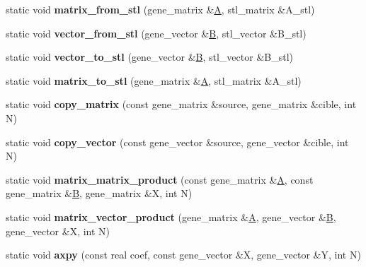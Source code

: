 \begin{DoxyCompactItemize}
static void {\bfseries matrix\+\_\+from\+\_\+stl} (gene\+\_\+matrix \&\hyperlink{group___core___module_class_eigen_1_1_matrix}{A}, stl\+\_\+matrix \&A\+\_\+stl)
\item 
\mbox{\label{classtiny__blitz__interface_a6707d134768a5efeec105f9a629e08ad}} 
static void {\bfseries vector\+\_\+from\+\_\+stl} (gene\+\_\+vector \&\hyperlink{group___core___module_class_eigen_1_1_matrix}{B}, stl\+\_\+vector \&B\+\_\+stl)
\item 
\mbox{\label{classtiny__blitz__interface_a8e5291a4089ac65bc2f85a63887cf01b}} 
static void {\bfseries vector\+\_\+to\+\_\+stl} (gene\+\_\+vector \&\hyperlink{group___core___module_class_eigen_1_1_matrix}{B}, stl\+\_\+vector \&B\+\_\+stl)
\item 
\mbox{\label{classtiny__blitz__interface_ac76e0cdc391a7393cf83ae53ae2b4967}} 
static void {\bfseries matrix\+\_\+to\+\_\+stl} (gene\+\_\+matrix \&\hyperlink{group___core___module_class_eigen_1_1_matrix}{A}, stl\+\_\+matrix \&A\+\_\+stl)
\item 
\mbox{\label{classtiny__blitz__interface_ad79c33f9a498bc78296d6d0b16666ed2}} 
static void {\bfseries copy\+\_\+matrix} (const gene\+\_\+matrix \&source, gene\+\_\+matrix \&cible, int N)
\item 
\mbox{\label{classtiny__blitz__interface_a7bad519f87a2e816fc1057be59fa8274}} 
static void {\bfseries copy\+\_\+vector} (const gene\+\_\+vector \&source, gene\+\_\+vector \&cible, int N)
\item 
\mbox{\label{classtiny__blitz__interface_a3e82c9c3e4313dca04a39a1e008c3338}} 
static void {\bfseries matrix\+\_\+matrix\+\_\+product} (const gene\+\_\+matrix \&\hyperlink{group___core___module_class_eigen_1_1_matrix}{A}, const gene\+\_\+matrix \&\hyperlink{group___core___module_class_eigen_1_1_matrix}{B}, gene\+\_\+matrix \&X, int N)
\item 
\mbox{\label{classtiny__blitz__interface_a3ea2c99ad23bd6b1fdcac48daca36a0a}} 
static void {\bfseries matrix\+\_\+vector\+\_\+product} (gene\+\_\+matrix \&\hyperlink{group___core___module_class_eigen_1_1_matrix}{A}, gene\+\_\+vector \&\hyperlink{group___core___module_class_eigen_1_1_matrix}{B}, gene\+\_\+vector \&X, int N)
\item 
\mbox{\label{classtiny__blitz__interface_ac1c10a663efa08c588815583929872d6}} 
static void {\bfseries axpy} (const real coef, const gene\+\_\+vector \&X, gene\+\_\+vector \&Y, int N)
\end{DoxyCompactItemize}


